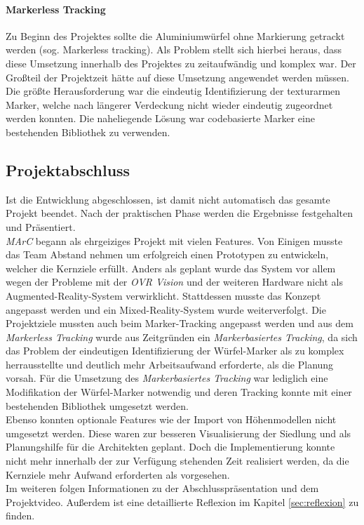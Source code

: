\paragraph{Markerless Tracking}
 Zu Beginn des Projektes sollte die Aluminiumwürfel ohne Markierung getrackt werden (sog. Markerless tracking). Als Problem stellt sich hierbei heraus, dass diese Umsetzung innerhalb des Projektes zu zeitaufwändig und komplex war. Der Großteil der Projektzeit hätte auf diese Umsetzung angewendet werden müssen. Die größte Herausforderung war die eindeutig Identifizierung der texturarmen Marker, welche nach längerer Verdeckung nicht wieder eindeutig zugeordnet werden konnten. Die naheliegende Lösung war codebasierte Marker eine bestehenden Bibliothek zu verwenden.


\subsection{Projektabschluss}
Ist die Entwicklung abgeschlossen, ist damit nicht automatisch das gesamte Projekt beendet. Nach der praktischen Phase werden die Ergebnisse festgehalten und Präsentiert. \\
\textit{MArC} begann als ehrgeiziges Projekt mit vielen Features. Von Einigen musste das Team Abstand nehmen um erfolgreich einen Prototypen zu entwickeln, welcher die Kernziele erfüllt. Anders als geplant wurde das System vor allem wegen der Probleme mit der \textit{OVR Vision} und der weiteren Hardware nicht als Augmented-Reality-System verwirklicht. Stattdessen musste das Konzept angepasst werden und ein Mixed-Reality-System wurde weiterverfolgt. 
Die Projektziele mussten auch beim Marker-Tracking angepasst werden und aus dem \textit{Markerless Tracking} wurde aus Zeitgründen ein \textit{Markerbasiertes Tracking}, da sich das Problem der eindeutigen Identifizierung der Würfel-Marker als zu komplex herrausstellte und deutlich mehr Arbeitsaufwand erforderte, als die Planung vorsah. Für die Umsetzung des \textit{Markerbasiertes Tracking} war lediglich eine Modifikation der Würfel-Marker notwendig und deren Tracking konnte mit einer bestehenden Bibliothek umgesetzt werden.\\
Ebenso konnten optionale Features wie der Import von Höhenmodellen nicht umgesetzt werden. Diese waren zur besseren Visualisierung der Siedlung und als Planungshilfe für die Architekten geplant. Doch die Implementierung konnte nicht mehr innerhalb der zur Verfügung stehenden Zeit realisiert werden, da die Kernziele mehr Aufwand erforderten als vorgesehen.\\
Im weiteren folgen Informationen zu der Abschlusspräsentation und dem Projektvideo. Außerdem ist eine detaillierte Reflexion im Kapitel \ref{sec:reflexion} zu finden.
